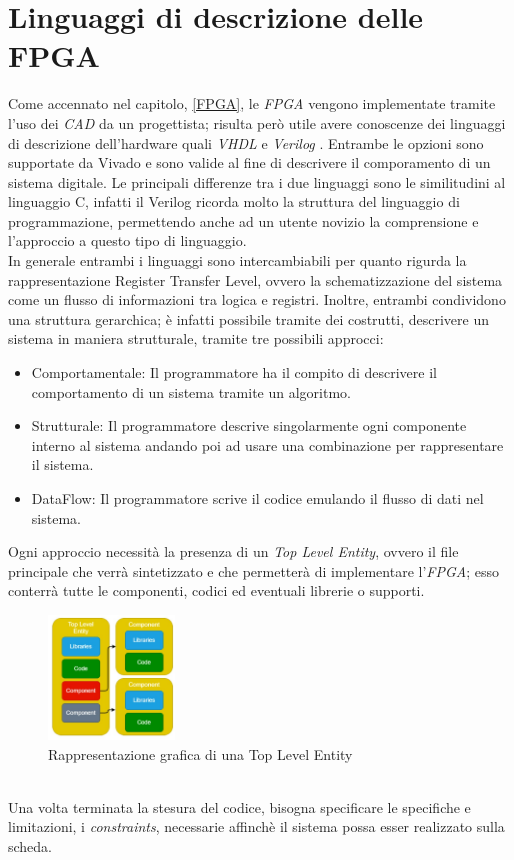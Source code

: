 \section{Linguaggi di descrizione delle FPGA}
Come accennato nel capitolo, \ref{FPGA}, le \textit{FPGA} vengono implementate tramite l'uso dei \textit{CAD} da un progettista; risulta però utile avere conoscenze dei linguaggi di descrizione dell'hardware quali \textit{VHDL}\cite{VHDL} e \textit{Verilog}\cite{Verilog} . Entrambe le opzioni sono supportate da Vivado e sono valide al fine di descrivere il comporamento di un sistema digitale. Le principali differenze tra i due linguaggi sono le similitudini al linguaggio C, infatti il Verilog ricorda molto la struttura del linguaggio di programmazione, permettendo anche ad un utente novizio la comprensione e l'approccio a questo tipo di linguaggio.\\
In generale entrambi i linguaggi sono intercambiabili per quanto rigurda la rappresentazione Register Transfer Level, ovvero la schematizzazione del sistema come un flusso di informazioni tra logica e registri. Inoltre, entrambi condividono una struttura gerarchica; è infatti  possibile tramite dei costrutti, descrivere un sistema in maniera strutturale, tramite tre possibili approcci:
\begin{itemize}
    \item Comportamentale: Il programmatore ha il compito di descrivere il comportamento di un sistema tramite un algoritmo.
    \item Strutturale: Il programmatore descrive singolarmente ogni componente interno al sistema andando poi ad usare una combinazione per rappresentare il sistema.
    \item DataFlow: Il programmatore scrive il codice emulando il flusso di dati nel sistema.
\end{itemize}
Ogni approccio necessità la presenza di un \textit{Top Level Entity}, ovvero il file principale che verrà sintetizzato e che permetterà di implementare l'\textit{FPGA}; esso conterrà tutte le componenti, codici ed eventuali librerie o supporti.
\begin{figure}[h]
\centering
\includegraphics[width=0.3\textwidth]{images/VHFL.jpg}
\caption{Rappresentazione grafica di una Top Level Entity\cite{TesiMattia}}
\end{figure}\\
Una volta terminata la stesura del codice, bisogna specificare le specifiche e limitazioni, i \textit{constraints}, necessarie affinchè il sistema possa esser realizzato sulla scheda.
